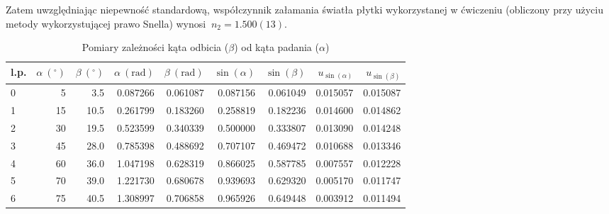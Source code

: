 \documentclass[a4paper]{article}
\begin{document}
Zatem uwzględniając niepewność standardową, współczynnik załamania światła płytki wykorzystanej w ćwiczeniu (obliczony przy użyciu metody wykorzystującej prawo Snella) wynosi $\ n_2 = 1.500(13)$.
\begin{table}
\centering
\begin{tabular}{lrrrrrrrr}
\toprule

l.p.&  $\alpha \ ({}^\circ)$ & $\beta \ ({}^\circ)$ &  $\alpha \ (\text{rad})$ &  $\beta \ (\text{rad})$ &  $\sin(\alpha)$ &  $\sin(\beta)$ &  $u_{\sin(\alpha)}$ &  $u_{\sin(\beta)}$ \\
\midrule
0  &           5 &         3.5& 0.087266 &    0.061087 &   0.087156 &   0.061049 &              0.015057 &              0.015087 \\
1  &          15 &        10.5 & 0.261799 &    0.183260 &   0.258819 &   0.182236 &              0.014600 &              0.014862 \\
2 & 30 & 19.5 &0.523599 &    0.340339 &   0.500000 &   0.333807 &              0.013090 &              0.014248 \\
3&          45 &        28.0 & 0.785398 &    0.488692 &   0.707107 &   0.469472 &              0.010688 &              0.013346 \\
4&          60 &        36.0 & 1.047198 &    0.628319 &   0.866025 &   0.587785 &              0.007557 &              0.012228 \\
5  &          70 &        39.0& 1.221730 &    0.680678 &   0.939693 &   0.629320 &              0.005170 &              0.011747 \\
6 &          75 &        40.5& 1.308997 &    0.706858 &   0.965926 &   0.649448 &              0.003912 &              0.011494 \\
\bottomrule
\end{tabular}

\caption{Pomiary zależności kąta odbicia ($\beta$) od kąta padania ($\alpha$)}
\label{snell-pomiary}
\end{table}
\end{document}
